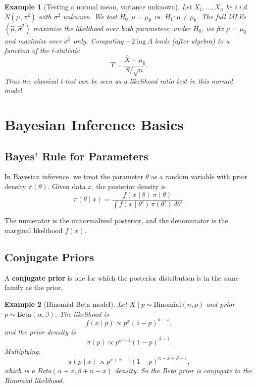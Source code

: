 \documentclass[11pt,a4paper]{article}
\newtheorem{example}{Example}[section]
\begin{document}
\begin{example}[Testing a normal mean, variance unknown]
Let $X_1,\dots,X_n$ be i.i.d. $N(\mu,\sigma^2)$ with $\sigma^2$ unknown. 
We test $H_0:\mu=\mu_0$ vs. $H_1:\mu\ne\mu_0$. 
The full MLEs $(\hat{\mu},\hat{\sigma}^2)$ maximize the likelihood over both parameters; under $H_0$, we fix $\mu=\mu_0$ and maximize over $\sigma^2$ only. 
Computing $-2\log\Lambda$ leads (after algebra) to a function of the t-statistic
\[
T = \frac{\bar{X} - \mu_0}{S/\sqrt{n}}.
\]
Thus the classical t-test can be seen as a likelihood ratio test in this normal model.

\end{example}

\newpage

\section{Bayesian Inference Basics}
\label{sec:bayes}

\subsection{Bayes' Rule for Parameters}

In Bayesian inference, we treat the parameter $\theta$ as a random variable with prior density $\pi(\theta)$. 
Given data $x$, the posterior density is
\[
\pi(\theta \mid x) =
\frac{f(x \mid \theta)\,\pi(\theta)}{\int f(x \mid \theta')\,\pi(\theta')\,d\theta'}.
\]

The numerator is the unnormalized posterior, and the denominator is the marginal likelihood $f(x)$.

\subsection{Conjugate Priors}

A \textbf{conjugate prior} is one for which the posterior distribution is in the same family as the prior.

\begin{example}[Binomial-Beta model]
Let $X \mid p \sim \text{Binomial}(n,p)$ and prior $p \sim \text{Beta}(\alpha,\beta)$. 
The likelihood is
\[
f(x \mid p) \propto p^x(1-p)^{n-x},
\]
and the prior density is
\[
\pi(p) \propto p^{\alpha-1}(1-p)^{\beta-1}.
\]
Multiplying,
\[
\pi(p \mid x) \propto p^{x+\alpha-1}(1-p)^{n-x+\beta-1},
\]
which is a Beta$(\alpha+x,\beta+n-x)$ density. 
So the Beta prior is conjugate to the Binomial likelihood.

\end{example}
\end{document}
